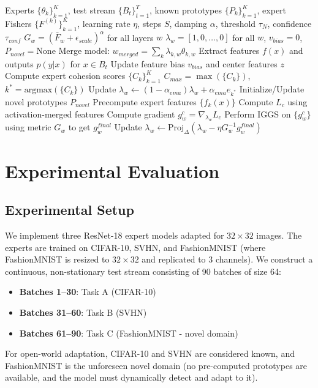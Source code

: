 \documentclass{article}
\theoremstyle{plain}
\theoremstyle{definition}
\theoremstyle{remark}
\begin{document}
\begin{algorithm}[tb]
\caption{IG-PROTO-TTMM Algorithm}
\label{alg:igprotottmm}
\begin{algorithmic}[1]
 Experts $\{\theta_k\}_{k=1}^K$, test stream $\{B_t\}_{t=1}^T$, known prototypes $\{P_k\}_{k=1}^K$, expert Fishers $\{F^{(k)}\}_{k=1}^K$, learning rate $\eta$, steps $S$, damping $\alpha$, threshold $\tau_N$, confidence $\tau_{conf}$
 $G_w = (\bar{F}_w + \epsilon_{scale})^\alpha$ for all layers $w$
 $\lambda_w = [1, 0, \dots, 0]$ for all $w$, $v_{bias} = 0$, $P_{novel} = \text{None}$
  \STATE Merge model: $w_{merged} = \sum_k \lambda_{k,w} \theta_{k,w}$
  \STATE Extract features $f(x)$ and outputs $p(y|x)$ for $x \in B_t$
  \STATE Update feature bias $v_{bias}$ and center features $z$
  \STATE Compute expert cohesion scores $\{C_k\}_{k=1}^K$
  \STATE $C_{max} = \max(\{C_k\})$, $k^* = \text{argmax}(\{C_k\})$
    \STATE {}
    \STATE Update $\lambda_w \leftarrow (1-\alpha_{ema})\lambda_w + \alpha_{ema} e_{k^*}$
  \ELSE
    \STATE {}
    \STATE Initialize/Update novel prototypes $P_{novel}$
    \STATE Precompute expert features $\{f_k(x)\}$
        \STATE Compute $L_c$ using activation-merged features
        \STATE Compute gradient $g^c_w = \nabla_{\lambda_w} L_c$
      \ENDFOR
      \STATE Perform IGGS on $\{g^c_w\}$ using metric $G_w$ to get $g^{final}_w$
      \STATE Update $\lambda_w \leftarrow \text{Proj}_{\Delta} (\lambda_w - \eta G_w^{-1} g^{final}_w)$
    \ENDFOR
  \ENDIF
\ENDFOR
\end{algorithmic}
\end{algorithm}

\section{Experimental Evaluation}
\label{experiments}

\subsection{Experimental Setup}
We implement three ResNet-18 expert models adapted for $32 \times 32$ images. The experts are trained on CIFAR-10, SVHN, and FashionMNIST (where FashionMNIST is resized to $32 \times 32$ and replicated to 3 channels).
We construct a continuous, non-stationary test stream consisting of 90 batches of size 64:
\begin{itemize}
  \item \textbf{Batches 1--30}: Task A (CIFAR-10)
  \item \textbf{Batches 31--60}: Task B (SVHN)
  \item \textbf{Batches 61--90}: Task C (FashionMNIST - novel domain)
\end{itemize}
For open-world adaptation, CIFAR-10 and SVHN are considered known, and FashionMNIST is the unforeseen novel domain (no pre-computed prototypes are available, and the model must dynamically detect and adapt to it).
\end{document}
